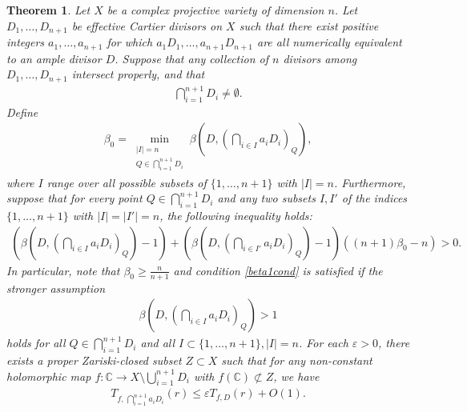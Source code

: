 \documentclass[10pt,a4paper]{amsart}
\newtheorem{theorem}{Theorem}
\begin{document}
\begin{theorem}\label{complexgcd2}
Let $X$ be a complex projective variety  of dimension $n$. 
Let $D_1, \ldots,D_{n+1}$ be effective Cartier  divisors on $X$ such that  there exist positive integers $a_1,\ldots, a_{n+1}$ for which $a_1D_1, \ldots, a_{n+1}D_{n+1}$ are all numerically equivalent to an ample divisor $D$.  
Suppose that  any collection of $n$ divisors among  $D_1, \ldots,D_{n+1}$ intersect properly, and that 
\begin{align*}
\bigcap_{i=1}^{n+1}D_i\neq \emptyset.
\end{align*}
Define
\begin{align*}
\beta_0=\min_{\substack{|I|=n\\Q\in \bigcap_{i=1}^{n+1}D_i }} \beta(D,(\bigcap_{i \in I} a_iD_i)_Q),
\end{align*}
where $I$ range over all possible subsets of $\{1,\ldots,n+1\}$ with $|I|=n$.
Furthermore, suppose that for every point $Q\in \bigcap_{i=1}^{n+1}D_i$ and any two subsets $I,I'$ of the indices $\{1,\ldots,n+1\}$ with $|I|=|I'|=n$,  the following inequality holds:
\begin{align}
\label{beta1cond}
(\beta(D,(\bigcap_{i \in I}a_iD_i)_Q)-1)+(\beta(D,(\bigcap_{i \in I'}a_iD_i)_Q)-1)((n+1)\beta_0-n)>0. 
\end{align}
In particular,  note that 
 $\beta_0\geq \frac{n}{n+1}$ and condition \eqref{beta1cond} is satisfied if the stronger assumption
\begin{align}
\label{beta2cond}
\beta(D,(\bigcap_{i \in I}a_iD_i)_Q)>1
\end{align}
holds for all $Q\in  \bigcap_{i=1}^{n+1}D_i  $ and all $I \subset \{1,\ldots,n+1\}, |I|=n$.  
For each $\varepsilon>0$,   there exists a proper Zariski-closed subset $Z\subset X$ such that for any non-constant holomorphic map $f:\mathbb{C}\to X\setminus{\bigcup_{i=1}^{n+1} } D_i$ with $f(\mathbb{C})\not\subset Z$,  we have 
\begin{align*}
T_{f, \,\bigcap_{i=1}^{n+1}a_iD_i}(r) 
        \le \varepsilon  T_{f,D}(r)+O(1). 
\end{align*}
\end{theorem}
\end{document}
